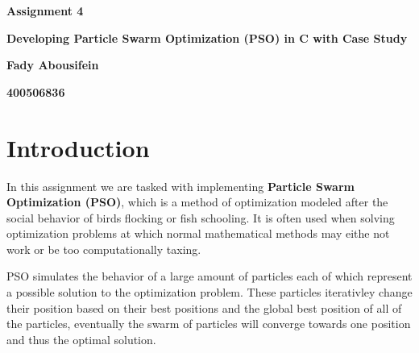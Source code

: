 \documentclass[12pt]{article}
\begin{document}
	
	\justifying
	
	\begin{center}
		\textbf{{\large Assignment 4}}
		
		\textbf{Developing Particle Swarm Optimization (PSO) in C with Case Study} 
		
		\textbf{Fady Abousifein}
		
		\textbf{400506836}
	\end{center}
	

	
	
	
	\section{Introduction}
	In this assignment we are tasked with implementing \textbf{Particle Swarm Optimization (PSO)}, which is a method of optimization modeled after the social behavior of birds flocking or fish schooling. It is often used when solving optimization problems at which normal mathematical methods may eithe not work or be too computationally taxing. 

PSO simulates the behavior of a large amount of particles each of which represent a possible solution to the optimization problem. These particles iterativley change their position based on their best positions and the global best position of all of the particles, eventually the swarm of particles will converge towards one position and thus the optimal solution.

	
\end{document}
